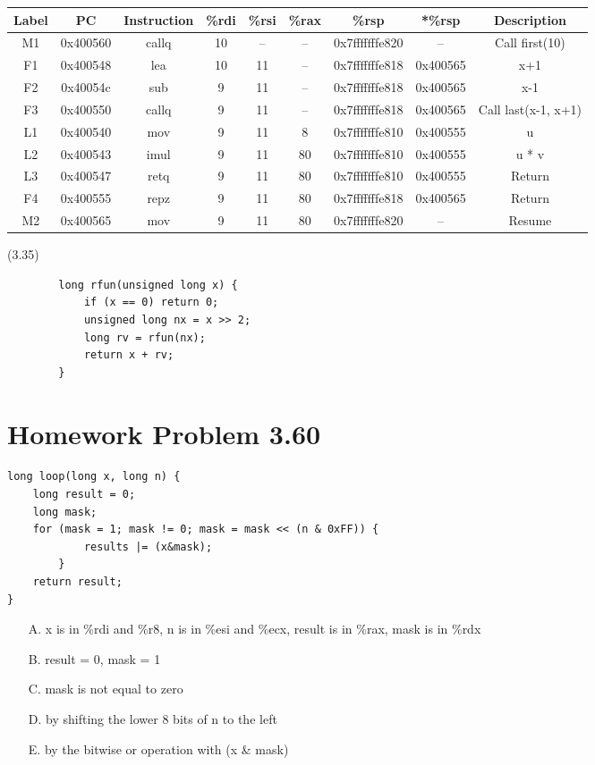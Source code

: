 \documentclass[11pt]{article}
\begin{document}
\begin{center}
		\begin{tabular} {|| c | c | c | c | c | c | c | c | c ||}
			\hline
			Label & PC & Instruction & \%rdi & \%rsi & \%rax &\%rsp & *\%rsp & Description \\ [0.5ex] 
			\hline
			\hline
			M1 & 0x400560 & callq & 10 & -- & -- & 0x7fffffffe820 & -- & Call first(10) \\
			F1 & 0x400548 & lea & 10 & 11 & -- & 0x7fffffffe818 & 0x400565 & x+1\\
			F2 & 0x40054c & sub & 9 & 11 & -- & 0x7fffffffe818 &  0x400565 & x-1 \\
			F3 & 0x400550 & callq & 9 & 11 & -- & 0x7fffffffe818 &  0x400565 & Call last(x-1, x+1) \\
			L1 & 0x400540 & mov & 9 & 11 & 8 & 0x7fffffffe810 &  0x400555 & u \\
			L2 & 0x400543 & imul & 9 & 11 & 80 & 0x7fffffffe810 &  0x400555 & u * v\\
			L3 & 0x400547 & retq & 9 & 11 & 80 & 0x7fffffffe810 &  0x400555 & Return \\
			F4 & 0x400555 & repz & 9 & 11 & 80 & 0x7fffffffe818 &  0x400565 & Return \\
			M2 & 0x400565 & mov & 9 & 11 & 80 & 0x7fffffffe820 & -- & Resume \\
			\hline 

		\end{tabular}
\end{center}
	\newpage
	(3.35)
	\begin{verbatim}
		long rfun(unsigned long x) {
		    if (x == 0) return 0;
		    unsigned long nx = x >> 2;
		    long rv = rfun(nx);
		    return x + rv;
		}
	\end{verbatim}

\section{Homework Problem 3.60}
\begin {verbatim}
long loop(long x, long n) {
    long result = 0;
    long mask;
    for (mask = 1; mask != 0; mask = mask << (n & 0xFF)) {
	        results |= (x&mask);
	    }
    return result;
}
\end{verbatim}
\begin{enumerate}
	\item[A.] x is in \%rdi and \%r8, n is in \%esi and \%ecx, result is in \%rax, mask is in \%rdx
	\item[B.] result = 0, mask = 1
	\item[C.] mask is not equal to zero
	\item[D.] by shifting the lower 8 bits of n to the left
	\item[E.] by the bitwise or operation with (x \& mask)
\end{enumerate}
\end{document}
